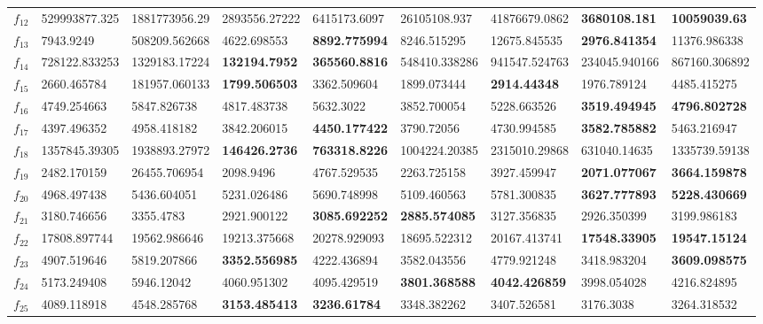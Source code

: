 \begin{table*}[t]
\begin{tabular}{|p{0.8cm}|p{1.6cm}|p{1.6cm}|p{1.6cm}|p{1.6cm}|p{1.6cm}|p{1.6cm}|p{1.6cm}|p{1.6cm}|}
$f_{12}$  & 529993877.325 & 1881773956.29 & 2893556.27222 & 6415173.6097 & 26105108.937 & 41876679.0862 & \textbf{3680108.181} & \textbf{10059039.63} \\ 
$f_{13}$  & 7943.9249 & 508209.562668 & 4622.698553 & \textbf{8892.775994} & 8246.515295 & 12675.845535 & \textbf{2976.841354} & 11376.986338 \\ 
$f_{14}$  & 728122.833253 & 1329183.17224 & \textbf{132194.7952} & \textbf{365560.8816} & 548410.338286 & 941547.524763 & 234045.940166 & 867160.306892 \\ 
$f_{15}$  & 2660.465784 & 181957.060133 & \textbf{1799.506503} & 3362.509604 & 1899.073444 & \textbf{2914.44348} & 1976.789124 & 4485.415275 \\ 
$f_{16}$  & 4749.254663 & 5847.826738 & 4817.483738 & 5632.3022 & 3852.700054 & 5228.663526 & \textbf{3519.494945} & \textbf{4796.802728} \\ 
$f_{17}$  & 4397.496352 & 4958.418182 & 3842.206015 & \textbf{4450.177422} & 3790.72056 & 4730.994585 & \textbf{3582.785882} & 5463.216947 \\ 
$f_{18}$  & 1357845.39305 & 1938893.27972 & \textbf{146426.2736} & \textbf{763318.8226} & 1004224.20385 & 2315010.29868 & 631040.14635 & 1335739.59138 \\ 
$f_{19}$  & 2482.170159 & 26455.706954 & 2098.9496 & 4767.529535 & 2263.725158 & 3927.459947 & \textbf{2071.077067} & \textbf{3664.159878} \\ 
$f_{20}$  & 4968.497438 & 5436.604051 & 5231.026486 & 5690.748998 & 5109.460563 & 5781.300835 & \textbf{3627.777893} & \textbf{5228.430669} \\ 
$f_{21}$  & 3180.746656 & 3355.4783 & 2921.900122 & \textbf{3085.692252} & \textbf{2885.574085} & 3127.356835 & 2926.350399 & 3199.986183 \\ 
$f_{22}$  & 17808.897744 & 19562.986646 & 19213.375668 & 20278.929093 & 18695.522312 & 20167.413741 & \textbf{17548.33905} & \textbf{19547.15124} \\ 
$f_{23}$  & 4907.519646 & 5819.207866 & \textbf{3352.556985} & 4222.436894 & 3582.043556 & 4779.921248 & 3418.983204 & \textbf{3609.098575} \\ 
$f_{24}$  & 5173.249408 & 5946.12042 & 4060.951302 & 4095.429519 & \textbf{3801.368588} & \textbf{4042.426859} & 3998.054028 & 4216.824895 \\ 
$f_{25}$  & 4089.118918 & 4548.285768 & \textbf{3153.485413} & \textbf{3236.61784} & 3348.382262 & 3407.526581 & 3176.3038 & 3264.318532 \\ 

\end{tabular}
\end{table*}
